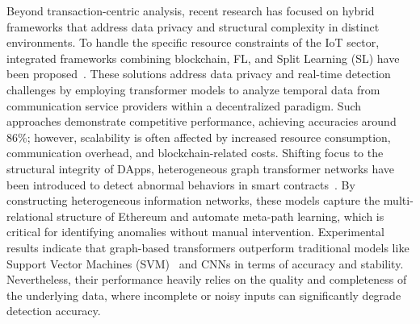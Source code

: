 \documentclass[5p,twocolumn]{elsarticle}
\begin{document}
Beyond transaction-centric analysis, recent research has focused on hybrid frameworks that address data privacy and structural complexity in distinct environments. To handle the specific resource constraints of the IoT sector, integrated frameworks combining blockchain, FL, and Split Learning (SL) have been proposed~\cite{batool2022block}. These solutions address data privacy and real-time detection challenges by employing transformer models to analyze temporal data from communication service providers within a decentralized paradigm. Such approaches demonstrate competitive performance, achieving accuracies around 86\%; however, scalability is often affected by increased resource consumption, communication overhead, and blockchain-related costs. Shifting focus to the structural integrity of DApps, heterogeneous graph transformer networks have been introduced to detect abnormal behaviors in smart contracts~\cite{liu2022blockchain}. By constructing heterogeneous information networks, these models capture the multi-relational structure of Ethereum and automate meta-path learning, which is critical for identifying anomalies without manual intervention. Experimental results indicate that graph-based transformers outperform traditional models like Support Vector Machines (SVM)~\cite{suthaharan2016support} and CNNs in terms of accuracy and stability. Nevertheless, their performance heavily relies on the quality and completeness of the underlying data, where incomplete or noisy inputs can significantly degrade detection accuracy.
\end{document}

